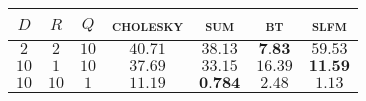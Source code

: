 
\begin{tabular}{|ccc|cccc|}
  \hline
  \abovespace\belowspace
  $D$ & $R$ & $Q$ & \textsc{cholesky} & \textsc{sum} & \textsc{bt} & \textsc{slfm}\\
\hline
  \abovespace
 $ 2 $ & $ 2 $ & $ 10 $ & $ 40.71 $ & $ 38.13 $ & $ \textbf{7.83} $ & $ 59.53 $ \\ 
 $ 10 $ & $ 1 $ & $ 10 $ & $ 37.69 $ & $ 33.15 $ & $ 16.39 $ & $ \textbf{11.59} $ \\ 
  $ 10 $ & $ 10 $ & $ 1 $ & $ 11.19 $ & $ \textbf{0.784} $ & $ 2.48 $ & $ 1.13 $

  \belowspace \\
  \hline
\end{tabular}
